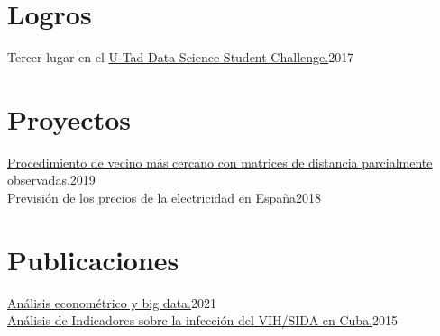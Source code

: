 \documentclass{muratcan_cv}
\begin{document}
\section{Logros}
 \datedexperience
 	{Tercer lugar en el 	\href{https://www.u-tad.com/alumnos-del-grado-ingenieria-software-u-tad-ganan-datathon-microsoft-espana/}{U-Tad Data Science Student Challenge.}}{2017}
%

\section{Proyectos} 
\datedexperience
	{\href{https://github.com/aldofranco91/TFM_Ing_Mat/blob/master/!!Tesis/Aldo_TFM.pdf}{Procedimiento de vecino más cercano con matrices de distancia parcialmente observadas.}}{2019} 
	 \\
%
\datedexperience
	{\href{https://github.com/aldofranco91/TFM_Big_Data/blob/master/!!Tesis/Aldo_TFM.pdf}{Previsión de los precios de la electricidad en España}}{2018} 

\section{Publicaciones}
\datedexperience
{\href{https://www.funcas.es/wp-content/uploads/2021/06/An\%C3\%A1lisis-econom\%C3\%A9trico-y-big-data.pdf}{Análisis econométrico y big data.}}{2021} \\
%
\datedexperience
{\href{https://1library.co/document/y4x1l85z-encuesta-indicadores-prevencion-infeccion-vih-sida.html}{Análisis de Indicadores sobre la infección del VIH/SIDA en Cuba.}}{2015} 

\end{document}
